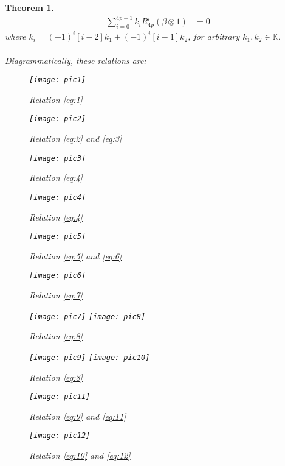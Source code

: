 \documentclass[]{article}
\newtheorem{thm}{Theorem}[section]
\begin{document}
\begin{thm}
\begin{align}
 \sum\limits_{i=0}^{4p-1} k_{i}R^{i}_{4p}(\beta\otimes 1)&=0 \label{eq:16}
 \end{align}
 where $k_{i}=(-1)^{i}[i-2]k_{1}+(-1)^{i}[i-1]k_{2}$, for arbitrary $k_{1},k_{2}\in\mathbb{K}$.\\
 \\
 Diagrammatically, these relations are:
 \begin{figure}[H]
 	\centering
 	\texttt{[image: pic1]}
 	\caption{Relation \ref{eq:1}}
 \end{figure}
 \begin{figure}[H]
 	\centering
 	\texttt{[image: pic2]}
 	\caption{Relation \ref{eq:2} and \ref{eq:3}}
 \end{figure}
 \begin{figure}[H]
 	\centering
 	\texttt{[image: pic3]}
 	\caption{Relation \ref{eq:4}}
 \end{figure}
 \begin{figure}[H]
 	\centering
 	\texttt{[image: pic4]}
 	\caption{Relation \ref{eq:4}}
 \end{figure}
 \begin{figure}[H]
 	\centering
 	\texttt{[image: pic5]}
 	\caption{Relation \ref{eq:5} and \ref{eq:6}}
 \end{figure}
 \begin{figure}[H]
 	\centering
 	\texttt{[image: pic6]}
 	\caption{Relation \ref{eq:7}}
 \end{figure}
 \begin{figure}[H]
 	\centering
 	\texttt{[image: pic7]}
 	\texttt{[image: pic8]}
 	\caption{Relation \ref{eq:8}}
 \end{figure}
 \begin{figure}[H]
 	\centering
 	\texttt{[image: pic9]}
 	\texttt{[image: pic10]}
 	\caption{Relation \ref{eq:8}}
 \end{figure}
 \begin{figure}[H]
 	\centering
 	\texttt{[image: pic11]}
 	\caption{Relation \ref{eq:9} and \ref{eq:11}}
 \end{figure}
 \begin{figure}[H]
 	\centering
 	\texttt{[image: pic12]}
 	\caption{Relation \ref{eq:10} and \ref{eq:12}}
 \end{figure}
 \begin{figure}[H]

\end{figure}
\end{thm}
\end{document}
